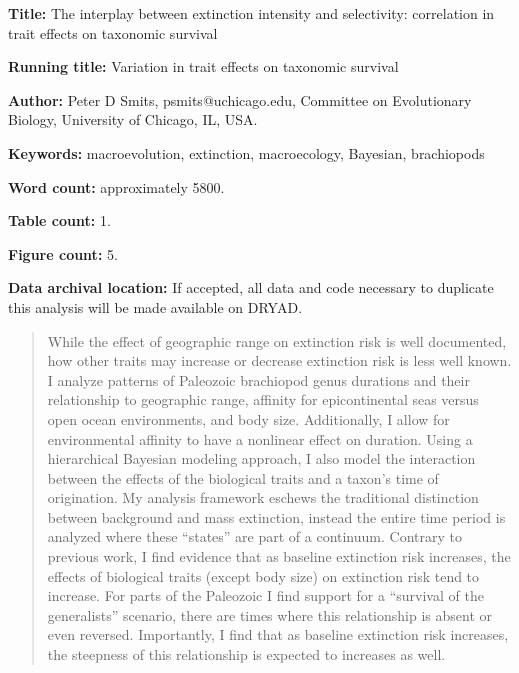 \documentclass{article}
\begin{document}
\linenumbers
\modulolinenumbers[2]


\begin{titlepage}
  \begin{large}
    \textbf{Title:} The interplay between extinction intensity and selectivity: correlation in trait effects on taxonomic survival
  \end{large}

  \textbf{Running title:} Variation in trait effects on taxonomic survival

  \textbf{Author:} Peter D Smits, psmits@uchicago.edu, Committee on Evolutionary Biology, University of Chicago, IL, USA.

  \textbf{Keywords:} macroevolution, extinction, macroecology, Bayesian, brachiopods

  \textbf{Word count:} approximately 5800.
  
  \textbf{Table count:} 1.
 
  \textbf{Figure count:} 5.

  \textbf{Data archival location:} If accepted, all data and code necessary to duplicate this analysis will be made available on DRYAD.

\end{titlepage}

\begin{abstract}
  While the effect of geographic range on extinction risk is well documented, how other traits may increase or decrease extinction risk is less well known. I analyze patterns of Paleozoic brachiopod genus durations and their relationship to geographic range, affinity for epicontinental seas versus open ocean environments, and body size. Additionally, I allow for environmental affinity to have a nonlinear effect on duration. Using a hierarchical Bayesian modeling approach, I also model the interaction between the effects of the biological traits and a taxon's time of origination. My analysis framework eschews the traditional distinction between background and mass extinction, instead the entire time period is analyzed where these ``states'' are part of a continuum. Contrary to previous work, I find evidence that as baseline extinction risk increases, the effects of biological traits (except body size) on extinction risk tend to increase. For parts of the Paleozoic I find support for a ``survival of the generalists'' scenario, there are times where this relationship is absent or even reversed. Importantly, I find that as baseline extinction risk increases, the steepness of this relationship is expected to increases as well.
\end{abstract}
\end{document}
